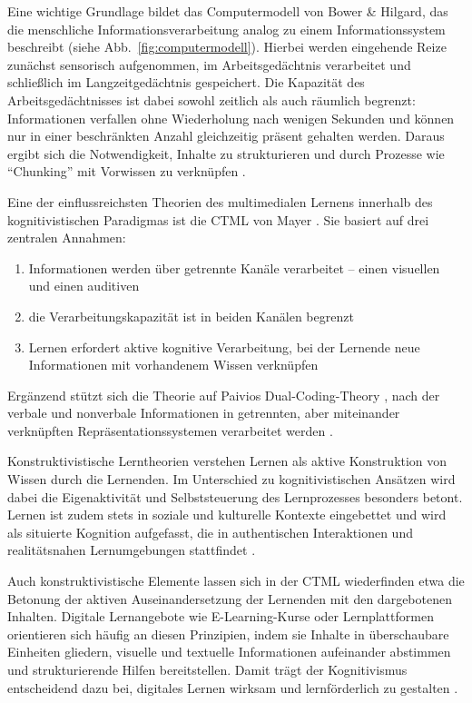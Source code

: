 Eine wichtige Grundlage bildet das Computermodell von Bower \& Hilgard, das die menschliche Informationsverarbeitung analog zu einem Informationssystem beschreibt (siehe Abb.~\ref{fig:computermodell}). Hierbei werden eingehende Reize zunächst sensorisch aufgenommen, im Arbeitsgedächtnis verarbeitet und schließlich im Langzeitgedächtnis gespeichert. Die Kapazität des Arbeitsgedächtnisses ist dabei sowohl zeitlich als auch räumlich begrenzt: Informationen verfallen ohne Wiederholung nach wenigen Sekunden und können nur in einer beschränkten Anzahl gleichzeitig präsent gehalten werden. Daraus ergibt sich die Notwendigkeit, Inhalte zu strukturieren und durch Prozesse wie \enquote{Chunking} mit Vorwissen zu verknüpfen \parencite[S.~15]{pfeiffer_simulationsumgebungen_2008}.

Eine der einflussreichsten Theorien des multimedialen Lernens innerhalb des kognitivistischen Paradigmas ist die \ac{CTML} von Mayer \parencite[S.~102--105]{mayer_multimedia_2001}. Sie basiert auf drei zentralen Annahmen:
\begin{enumerate}
	\item Informationen werden über getrennte Kanäle verarbeitet – einen visuellen und einen auditiven
	\item die Verarbeitungskapazität ist in beiden Kanälen begrenzt
	\item Lernen erfordert aktive kognitive Verarbeitung, bei der Lernende neue Informationen mit vorhandenem Wissen verknüpfen
\end{enumerate}

Ergänzend stützt sich die Theorie auf Paivios Dual-Coding-Theory \parencite[S.~102f]{paivia_dual_2006}, nach der verbale und nonverbale Informationen in getrennten, aber miteinander verknüpften Repräsentationssystemen verarbeitet werden \parencite[S.~66f]{furstenau_lehr-lern-theorien_2019}.

Konstruktivistische Lerntheorien verstehen Lernen als aktive Konstruktion von Wissen durch die Lernenden. Im Unterschied zu kognitivistischen Ansätzen wird dabei die Eigenaktivität und Selbststeuerung des Lernprozesses besonders betont. Lernen ist zudem stets in soziale und kulturelle Kontexte eingebettet und wird als situierte Kognition aufgefasst, die in authentischen Interaktionen und realitätsnahen Lernumgebungen stattfindet \parencite[S.~1f]{furstenau_lehr-lern-theorien_2019}.

Auch konstruktivistische Elemente lassen sich in der \ac{CTML} wiederfinden etwa die Betonung der aktiven Auseinandersetzung der Lernenden mit den dargebotenen Inhalten. Digitale Lernangebote wie E-Learning-Kurse oder Lernplattformen orientieren sich häufig an diesen Prinzipien, indem sie Inhalte in überschaubare Einheiten gliedern, visuelle und textuelle Informationen aufeinander abstimmen und strukturierende Hilfen bereitstellen. Damit trägt der Kognitivismus entscheidend dazu bei, digitales Lernen wirksam und lernförderlich zu gestalten \parencites[S.~105--106]{mayer_multimedia_2001}{mayer_mayers_nodate}.

